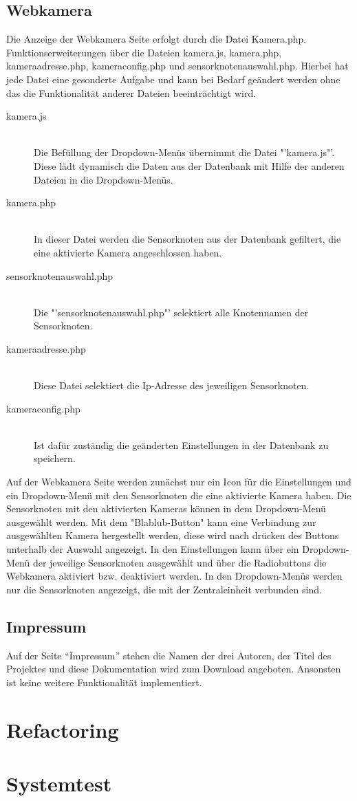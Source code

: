 \subsection{Webkamera}\label{Webkamera}
Die Anzeige der Webkamera Seite erfolgt durch die Datei Kamera.php. Funktionserweiterungen über die Dateien kamera.js, kamera.php, kameraadresse.php,  kameraconfig.php und sensorknotenauswahl.php. Hierbei hat jede Datei eine gesonderte Aufgabe und kann bei Bedarf geändert werden ohne das die Funktionalität anderer Dateien beeinträchtigt wird.
\begin{description}
	\item[kamera.js] \hfill \\
	Die Befüllung der Dropdown-Menüs übernimmt die Datei "'kamera.js"'. Diese lädt dynamisch die Daten aus der Datenbank mit Hilfe der anderen Dateien in die Dropdown-Menüs.
	\item[kamera.php] \hfill \\
	In dieser Datei werden die Sensorknoten aus der Datenbank gefiltert, die eine aktivierte Kamera angeschlossen haben.
	\item[sensorknotenauswahl.php] \hfill \\
	Die "'sensorknotenauswahl.php"' selektiert alle Knotennamen der Sensorknoten.
	\item[kameraadresse.php] \hfill \\
	Diese Datei selektiert die Ip-Adresse des jeweiligen Sensorknoten.
	\item[kameraconfig.php] \hfill \\
	Ist dafür zuständig die geänderten Einstellungen in der Datenbank zu speichern.
\end{description}
Auf der Webkamera Seite werden zunächst nur ein Icon für die Einstellungen und ein Dropdown-Menü mit den Sensorknoten die eine aktivierte Kamera haben. Die Sensorknoten mit den aktivierten Kameras können in dem Dropdown-Menü ausgewählt werden. Mit dem "Blablub-Button" kann eine Verbindung zur ausgewählten Kamera hergestellt werden, diese wird nach drücken des Buttons unterhalb der Auswahl angezeigt. In den Einstellungen kann über ein Dropdown-Menü der jeweilige Sensorknoten ausgewählt und über die Radiobuttons die Webkamera aktiviert bzw. deaktiviert werden. In den Dropdown-Menüs werden nur die Sensorknoten angezeigt, die mit der Zentraleinheit verbunden sind. 
\subsection{Impressum}

Auf der Seite "`Impressum"' stehen die Namen der drei Autoren, der Titel des Projektes und diese Dokumentation wird zum Download angeboten. Ansonsten ist keine weitere Funktionalität implementiert.
\section{Refactoring}
\section{Systemtest}
